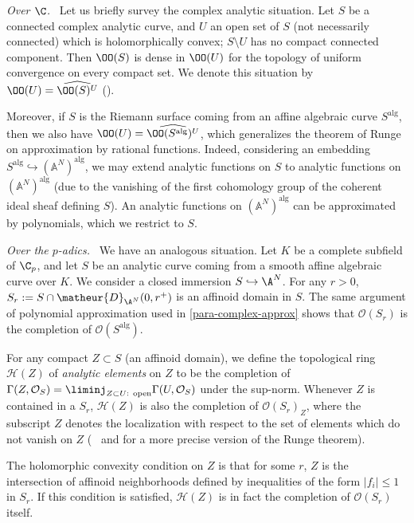 \begin{para}\label{para-complex-approx}
{\itshape Over $\C$.\ }
 Let us briefly survey the complex analytic situation.
 Let $S$ be a connected complex analytic curve, and $U$ an open set
 of $S$ (not necessarily connected) which is holomorphically convex; 
 \ie $S\setminus U$ has no compact connected component.
 Then $\OO(S)$ is dense in $\OO(U)$ for the topology of uniform
 convergence on every compact set.
 We denote this situation by $\OO(U)=\widehat{\OO(S)^U}$
 (\cf \eg \cite[13]{qadsdr}).

 Moreover, if $S$ is the Riemann surface coming from an affine algebraic
 curve $S^{\mathrm{alg}}$, then we also have 
 $\OO(U)=\widehat{\OO(S^{\mathrm{alg}})^U}$, which generalizes the theorem
 of Runge on approximation by rational functions.
 Indeed, considering an embedding $S^{\mathrm{alg}}\hookrightarrow
 (\mathbb{A}^N)^{\mathrm{alg}}$, we may extend analytic functions on $S$ to 
 analytic functions on $(\mathbb{A}^N)^{\mathrm{alg}}$
 (due to the vanishing of the first cohomology group of the
 coherent ideal sheaf defining $S$).
 An analytic functions on $(\mathbb{A}^N)^{\mathrm{alg}}$ can be 
 approximated by polynomials, which we restrict to $S$.
\end{para}

\begin{para}\label{para-ultra-approx}
{\itshape Over the $p$-adics.\ } We have an analogous situation. Let $K$ 
be a complete subfield of $\C_p$, and let $S$ be an analytic curve 
coming from a smooth affine algebraic curve over $K$. We consider a 
closed immersion $S \hookrightarrow {\A}^N$. For any $r > 0$, $S_r := S
\cap \matheur{D}_{{\A}^N}(0,r^+)$ is an affinoid domain in $S$. 
The same argument of polynomial approximation used in 
\ref{para-complex-approx} shows that $\mathcal{O}(S_r)$ is the 
completion of $\mathcal{O}(S^{\mathrm{alg}})$. 

 For any compact $Z \subset S$ (\eg an affinoid domain), we define the
 topological ring $\mathcal{H}(Z)$
 of \emph{analytic elements}
  on $Z$ to
 be the completion of $\Gamma (Z, \mathcal{O}_S) = \liminj_{Z\subset
 U \text{: open}}\Gamma (U, \mathcal{O}_S) $ under the sup-norm.
 Whenever $Z$ is contained in a $S_r$, $\mathcal{H}(Z)$ is also the
 completion of $\mathcal{O}(S_r)_Z$, where the subscript $Z$ denotes the
 localization with respect to the set of elements which do not vanish on
 $Z$ (\cf\ \cite{staagonf} and \cite{rdldaecpecd} for a more precise
version of the Runge theorem).

 The holomorphic convexity condition on $Z$ is that for some $r$, $Z$ is
 the intersection of affinoid neighborhoods defined by inequalities of
 the form $|f_i| \leq 1$ in $S_r$. If this condition is satisfied,
 $\mathcal{H}(Z)$ is in fact the completion of $\mathcal{O}(S_r)$ itself.
\end{para}

